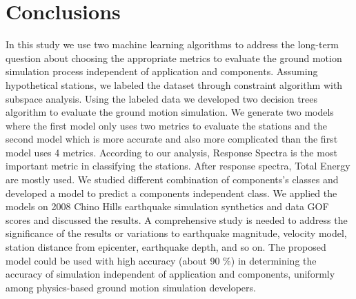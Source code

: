 
\section{Conclusions}

In this study we use two machine learning algorithms to address the long-term question about choosing the appropriate metrics to evaluate the ground motion simulation process independent of application and components. Assuming hypothetical stations, we labeled the dataset through constraint \kmeans{} algorithm with subspace analysis. Using the labeled data we developed two decision trees algorithm to evaluate the ground motion simulation. We generate two models where the first model only uses two metrics to evaluate the stations and the second model which is more accurate and also more complicated than the first model uses 4 metrics. According to our analysis, Response Spectra is the most important metric in classifying the stations. After response spectra, Total Energy are mostly used. We studied different combination of components's classes and developed a model to predict a components independent class. We applied the models on 2008 Chino Hills earthquake simulation synthetics and data GOF scores and discussed the results. A comprehensive study is needed to address the significance of the results or variations to earthquake magnitude, velocity model, station distance from epicenter, earthquake depth, and so on. The proposed model could be used with high accuracy (about 90 \%) in determining the accuracy of simulation independent of application and components, uniformly among physics-based ground motion simulation developers.  